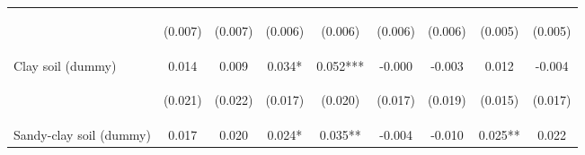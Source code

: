 \begin{center}
\begin{tabular}{lcccccccc}
\vspace{4pt} & \begin{footnotesize}(0.007)\end{footnotesize} & \begin{footnotesize}(0.007)\end{footnotesize} & \begin{footnotesize}(0.006)\end{footnotesize} & \begin{footnotesize}(0.006)\end{footnotesize} & \begin{footnotesize}(0.006)\end{footnotesize} & \begin{footnotesize}(0.006)\end{footnotesize} & \begin{footnotesize}(0.005)\end{footnotesize} & \begin{footnotesize}(0.005)\end{footnotesize} \\
Clay soil (dummy) & 0.014 & 0.009 & 0.034* & 0.052*** & -0.000 & -0.003 & 0.012 & -0.004 \\
\vspace{4pt} & \begin{footnotesize}(0.021)\end{footnotesize} & \begin{footnotesize}(0.022)\end{footnotesize} & \begin{footnotesize}(0.017)\end{footnotesize} & \begin{footnotesize}(0.020)\end{footnotesize} & \begin{footnotesize}(0.017)\end{footnotesize} & \begin{footnotesize}(0.019)\end{footnotesize} & \begin{footnotesize}(0.015)\end{footnotesize} & \begin{footnotesize}(0.017)\end{footnotesize} \\
Sandy-clay soil (dummy) & 0.017 & 0.020 & 0.024* & 0.035** & -0.004 & -0.010 & 0.025** & 0.022 \\

\end{tabular}
\end{center}
